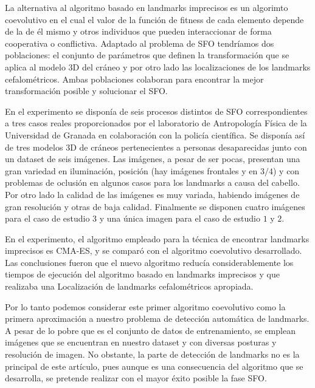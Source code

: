                 \medskip

                \noindent La alternativa al algoritmo basado en landmarks imprecisos es un algorimto coevolutivo en el cual el valor de la función de fitness de cada elemento depende de la de él mismo y otros individuos que pueden interaccionar de forma cooperativa o conflictiva. Adaptado al problema de SFO tendríamos dos poblaciones: el conjunto de parámetros que definen la transformación que se aplica al modelo $3$D del cráneo y por otro lado las localizaciones de los landmarks cefalométricos. Ambas poblaciones colaboran para encontrar la mejor transformación posible y solucionar el SFO.

                \medskip

                \noindent En el experimento se disponía de seis procesos distintos de SFO correspondientes a tres casos reales proporcionados por el laboratorio de Antropología Física de la Universidad de Granada en colaboración con la policía científica. Se disponía así de tres modelos $3$D de cráneos pertenecientes a personas desaparecidas junto con un dataset de seis imágenes. Las imágenes, a pesar de ser pocas, presentan una gran variedad en iluminación, posición (hay imágenes frontales y en $3/4$) y con problemas de oclusión en algunos casos para los landmarks a causa del cabello. Por otro lado la calidad de las imágenes es muy variada, habiendo imágenes de gran resolución y otras de baja calidad. Finalmente se disponen cuatro imágenes para el caso de estudio $3$ y una única imagen para el caso de estudio $1$ y $2$.

                \medskip
                

                \noindent En el experimento, el algoritmo empleado para la técnica de encontrar landmarks imprecisos es CMA-ES, y se comparó con el algoritmo coevolutivo desarrollado. Las conclusiones fueron que el nuevo algoritmo reducía considerablemente los tiempos de ejecución del algoritmo basado en landmarks imprecisos y que realizaba una Localización de landmarks cefalométricos apropiada. 
                
                \medskip

                \noindent Por lo tanto podemos considerar este primer algoritmo coevolutivo como la primera aproximación a nuestro problema de detección automática de landmarks. A pesar de lo pobre que es el conjunto de datos de entrenamiento, se emplean imágenes que se encuentran en nuestro dataset y con diversas posturas y resolución de imagen. No obstante, la parte de detección de landmarks no es la principal de este artículo, pues aunque es una consecuencia del algoritmo que se desarrolla, se pretende realizar con el mayor éxito posible la fase SFO.

